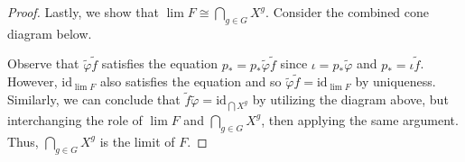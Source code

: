 \documentclass[ 12pt ]{article}
\begin{document}
\begin{enumerate}
\begin{proof}
			Lastly, we show that $\lim F \cong \bigcap_{g \in G} X^g$. Consider the combined cone diagram below.
			\begin{center}
			\end{center}
			Observe that $\widetilde{\varphi} \widetilde{f}$ satisfies the equation $p_\ast = p_\ast \widetilde{\varphi} \widetilde{f}$ since $\iota = p_\ast \widetilde{\varphi}$ and $p_\ast = \iota \widetilde{f}$. However, $\mathrm{id}_{\lim F}$ also satisfies the equation and so $\widetilde{\varphi} \widetilde{f} = \mathrm{id}_{\lim F}$ by uniqueness. Similarly, we can conclude that $\widetilde{f} \widetilde{\varphi} = \mathrm{id}_{\bigcap X^g}$ by utilizing the diagram above, but interchanging the role of $\lim F$ and $\bigcap_{g \in G} X^g$, then applying the same argument. Thus, $\bigcap_{g \in G} X^g$ is the limit of $F$.
		\end{proof}

\end{enumerate}
\end{document}
